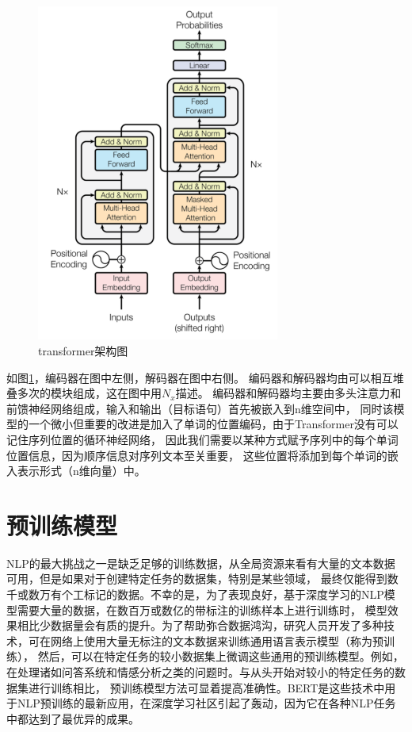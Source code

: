 \begin{figure}[htbp]
  \centering
  \includegraphics[width=8cm]{./images/transformer.png}
  \caption{transformer架构图\cite{vaswani2017attention}}
  \label{fig:transformer}
\end{figure}

如图\ref{fig:transformer}，编码器在图中左侧，解码器在图中右侧。 
编码器和解码器均由可以相互堆叠多次的模块组成，这在图中用$N_x$描述。 
编码器和解码器均主要由多头注意力和前馈神经网络组成，输入和输出（目标语句）首先被嵌入到n维空间中，
同时该模型的一个微小但重要的改进是加入了单词的位置编码，由于Transformer没有可以记住序列位置的循环神经网络，
因此我们需要以某种方式赋予序列中的每个单词位置信息，因为顺序信息对序列文本至关重要，
这些位置将添加到每个单词的嵌入表示形式（n维向量）中。

\section{预训练模型}
NLP的最大挑战之一是缺乏足够的训练数据，从全局资源来看有大量的文本数据可用，但是如果对于创建特定任务的数据集，特别是某些领域，
最终仅能得到数千或数万有个工标记的数据。不幸的是，为了表现良好，基于深度学习的NLP模型需要大量的数据，在数百万或数亿的带标注的训练样本上进行训练时，
模型效果相比少数据量会有质的提升。为了帮助弥合数据鸿沟，研究人员开发了多种技术，可在网络上使用大量无标注的文本数据来训练通用语言表示模型（称为预训练），
然后，可以在特定任务的较小数据集上微调这些通用的预训练模型。例如，在处理诸如问答系统和情感分析之类的问题时。与从头开始对较小的特定任务的数据集进行训练相比，
预训练模型方法可显着提高准确性。BERT\cite{devlin2018bert}是这些技术中用于NLP预训练的最新应用，在深度学习社区引起了轰动，因为它在各种NLP任务中都达到了最优异的成果。


